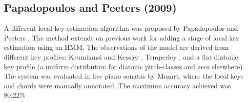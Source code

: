 

\subsection{Papadopoulos and Peeters (2009)}

A different local key estimation algorithm was proposed by Papadopoulos and Peeters \cite{papadopoulos2009local}. The method extends on previous work \cite{papadopoulos2008simultaneous} for adding a stage of local key estimation using an HMM. The observations of the model are derived from different key profiles: Krumhansl and Kessler \cite{krumhansl1982tracing}, Temperley \cite{temperley1999whats}, and a flat diatonic key profile (a uniform distribution for diatonic pitch-classes and \emph{zero} elsewhere). The system was evaluated in five piano sonatas by Mozart, where the local keys and chords were manually annotated. The maximum accuracy achieved was 80.22\%

